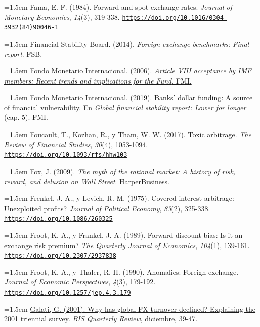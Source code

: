 \documentclass[10pt,a4paper]{article}
\begin{document}
\noindent\hangindent=1.5em Fama, E. F. (1984). Forward and spot exchange rates. \textit{Journal of Monetary Economics}, \textit{14}(3), 319-338. \href{https://doi.org/10.1016/0304-3932(84)90046-1}{\nolinkurl{https://doi.org/10.1016/0304-3932(84)90046-1}}

\noindent\hangindent=1.5em Financial Stability Board. (2014). \textit{Foreign exchange benchmarks: Final report}. FSB.

\noindent\hangindent=1.5em \href{https://www.imf.org/external/np/pp/eng/2006/052606.pdf}{Fondo Monetario Internacional. (2006). \textit{Article VIII acceptance by IMF members: Recent trends and implications for the Fund}. FMI.}

\noindent\hangindent=1.5em Fondo Monetario Internacional. (2019). Banks' dollar funding: A source of financial vulnerability. En \textit{Global financial stability report: Lower for longer} (cap. 5). FMI.

\noindent\hangindent=1.5em Foucault, T., Kozhan, R., y Tham, W. W. (2017). Toxic arbitrage. \textit{The Review of Financial Studies}, \textit{30}(4), 1053-1094. \href{https://doi.org/10.1093/rfs/hhw103}{\nolinkurl{https://doi.org/10.1093/rfs/hhw103}}

\noindent\hangindent=1.5em Fox, J. (2009). \textit{The myth of the rational market: A history of risk, reward, and delusion on Wall Street}. HarperBusiness.

\noindent\hangindent=1.5em Frenkel, J. A., y Levich, R. M. (1975). Covered interest arbitrage: Unexploited profits? \textit{Journal of Political Economy}, \textit{83}(2), 325-338. \href{https://doi.org/10.1086/260325}{\nolinkurl{https://doi.org/10.1086/260325}}

\noindent\hangindent=1.5em Froot, K. A., y Frankel, J. A. (1989). Forward discount bias: Is it an exchange risk premium? \textit{The Quarterly Journal of Economics}, \textit{104}(1), 139-161. \href{https://doi.org/10.2307/2937838}{\nolinkurl{https://doi.org/10.2307/2937838}}

\noindent\hangindent=1.5em Froot, K. A., y Thaler, R. H. (1990). Anomalies: Foreign exchange. \textit{Journal of Economic Perspectives}, \textit{4}(3), 179-192. \href{https://doi.org/10.1257/jep.4.3.179}{\nolinkurl{https://doi.org/10.1257/jep.4.3.179}}

\noindent\hangindent=1.5em \href{https://www.bis.org/publications/qr/r-qt0112e.pdf}{Galati, G. (2001). Why has global FX turnover declined? Explaining the 2001 triennial survey. \textit{BIS Quarterly Review}, diciembre, 39-47.}
\end{document}
